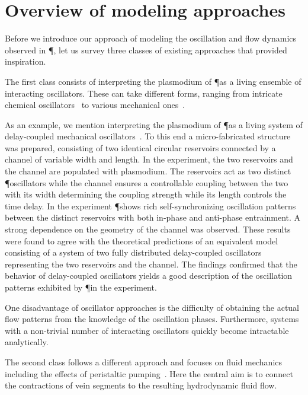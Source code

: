 
\section{Overview of modeling approaches}\label{sec:model}

  Before we introduce our approach of modeling the oscillation and flow dynamics observed in \P, let us survey three classes of existing approaches that provided inspiration. 

  The first class consists of interpreting the plasmodium of \P as a living ensemble of interacting oscillators. These can take different forms, ranging from intricate chemical oscillators~\cite{Smith1992368} to various mechanical ones~\cite{PhysRevLett.85.2026,tero2005coupled,takamatsu2001spatiotemporal}. 

  As an example, we mention interpreting the plasmodium of \P as a living system of delay-coupled mechanical oscillators~\cite{PhysRevLett.85.2026}. To this end a micro-fabricated structure was prepared, consisting of two identical circular reservoirs connected by a channel of variable width and length. In the experiment, the two reservoirs and the channel are populated with plasmodium. The reservoirs act as two distinct \P oscillators while the channel ensures a controllable coupling between the two with its width determining the coupling strength while its length controls the time delay. In the experiment \P shows rich self-synchronizing oscillation patterns between the distinct reservoirs with both in-phase and anti-phase entrainment. A strong dependence on the geometry of the channel was observed. These results were found to agree with the theoretical predictions of an equivalent model consisting of a system of two fully distributed delay-coupled oscillators representing the two reservoirs and the channel. The findings confirmed that the behavior of delay-coupled oscillators yields a good description of the oscillation patterns exhibited by \P in the experiment.

  One disadvantage of oscillator approaches is the difficulty of obtaining the actual flow patterns from the knowledge of the oscillation phases. Furthermore, systems with a non-trivial number of interacting oscillators quickly become intractable analytically.

  The second class follows a different approach and focuses on fluid mechanics including the effects of peristaltic pumping~\cite{alim2013random,teplov1991continuum}. Here the central aim is to connect the contractions of vein segments to the resulting hydrodynamic fluid flow.

